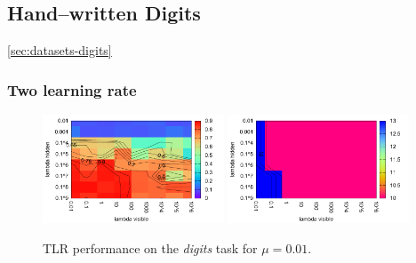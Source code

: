 

\subsection{Hand--written Digits} 
\label{sec:results-digits} 

\ref{sec:datasets-digits} 

\subsubsection{Two learning rate} 
\label{sec:tlr-digits} 

\begin{figure}[H]
  \centering
  \includegraphics[width=0.48\textwidth]{img/tlr-digits-psf.pdf} 
  \includegraphics[width=0.48\textwidth]{img/tlr-digits-epoch.pdf}     
  \caption{TLR performance on the \emph{digits} task for $\mu = 0.01$.}
  \label{fig:results-tlr-digits-success}
\end{figure}

